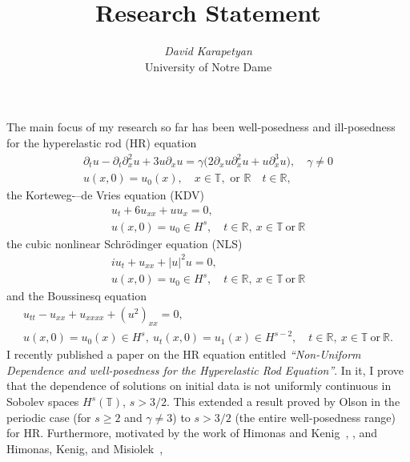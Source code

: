 \documentclass[12pt,reqno]{amsart}
\newcommand{\rr}{\mathbb{R}}
\newcommand{\ci}{\mathbb{T}}
\newcommand{\p}{\partial}
\begin{document}
\title{Research Statement} 
\author{{\it David Karapetyan}\\
University of Notre Dame}
\maketitle


\parindent0in
\parskip0.1in
%
%
%
\setcounter{section}{0}

The main focus of my research so far has been well-posedness and ill-posedness
for the hyperelastic rod (HR) equation
%
%
\begin{gather}
\label{hr}
\p_t u
-
\p_t \p_x^2 u
+
3u\p_x u
=
\gamma \big (
2\p_x u \p_x^2 u
+
u \p_x^3 u
\big ), \quad \gamma \neq 0
\\
\label{hr-data} u(x, 0) = u_0 (x),
\quad x  \in \ci, \text{  or  } \rr \quad t \in \rr,
\end{gather}
%
%
the Korteweg-–de Vries equation (KDV) 
\begin{gather}
  u_{t} + 6u_{xx} + u u_{x} = 0,
  \\
  u(x,0) = u_{0} \in H^{s}, \quad t \in \rr, \ x \in \ci \ \text{or} \ \rr
\end{gather}
%
%
the cubic nonlinear Schr\"odinger
equation (NLS)
\begin{gather}
  iu_{t} + u_{xx} + | u |^{2}u = 0,
\\
u(x,0) = u_{0} \in H^{s}, \quad t \in \rr, \ x \in \ci \ \text{or} \ \rr
\end{gather}
%
%
%
and the Boussinesq
equation
\begin{gather}
   u_{tt} - u_{xx} + u_{xxxx} + (u^{2})_{xx} = 0,
  \\
   u(x,0) = u_{0}(x) \in H^{s}, \  u_{t}(x,0) = u_{1}(x) \in H^{s-2},
  \quad t \in \rr, \ x \in \ci \ \text{or} \ \rr.
\end{gather}
I recently published a paper on the HR equation entitled 
{\it ``Non-Uniform Dependence  and well-posedness
for the
Hyperelastic Rod Equation''}. In it, I prove
that 
the dependence of solutions on initial data is not uniformly 
continuous in Sobolev spaces $H^s(\ci)$, $s>3/2$.
This extended a result proved by Olson 
\cite{Olson_2006_Non-uniform-dep} in the periodic
case (for $s\ge 2$ and $\gamma \ne 3$)  to  $s>3/2$ (the entire well-posedness
range) for HR. Furthermore, motivated by the work of Himonas and
Kenig~\cite{Himonas:2009fk}, \cite{Himonas:2009fk}, and 
Himonas, Kenig, and Misiolek~\cite{Himonas_2009_Non-uniform-dep-per},
\end{document}
